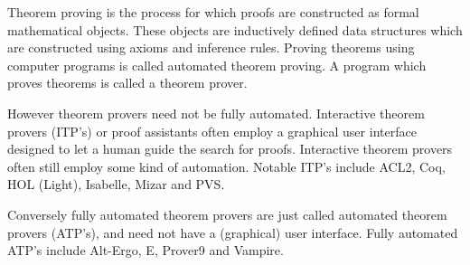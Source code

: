 Theorem proving is the process for which proofs are constructed as formal mathematical objects.
These objects are inductively defined data structures which are constructed using axioms and inference rules.
Proving theorems using computer programs is called automated theorem proving.
A program which proves theorems is called a theorem prover.

However theorem provers need not be fully automated.
Interactive theorem provers (ITP's) or proof assistants often employ a graphical user interface designed to let a human guide the search for proofs.
Interactive theorem provers often still employ some kind of automation.
Notable ITP's include ACL2, Coq, HOL (Light), Isabelle, Mizar and PVS.

Conversely fully automated theorem provers are just called automated theorem provers (ATP's), and need not have a (graphical) user interface.
Fully automated ATP's include Alt-Ergo, E, Prover9 and Vampire.



